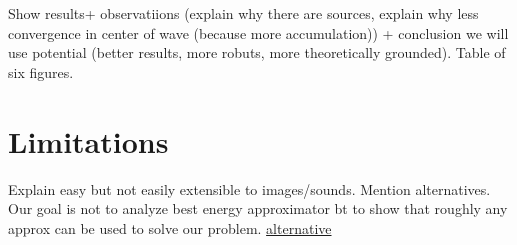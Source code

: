 Show results+ observatiions (explain why there are sources, explain why less convergence in center of wave (because more accumulation)) + conclusion we will use potential (better results, more robuts, more theoretically grounded). Table of six figures.


\section{Limitations}

Explain easy but not easily extensible to images/sounds. Mention alternatives. Our goal is not to analyze best energy approximator bt to show that roughly any approx can be used to solve our problem.
\href{https://arxiv.org/pdf/1606.03439.pdf}{alternative}